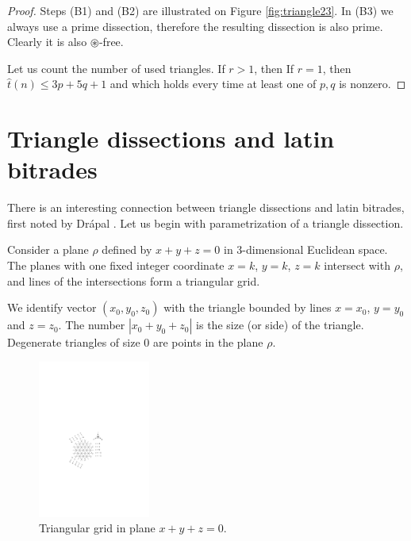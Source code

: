 \begin{proof}
Steps (B1) and (B2) are illustrated on Figure \ref{fig:triangle23}. In (B3) we always use a prime dissection, therefore the resulting dissection is also prime. Clearly it is also $\circledast$-free.

Let us count the number of used triangles. If $r > 1$, then
If $r=1$, then $\hat t(n) \leq 3p + 5q + 1$ and
which holds every time at least one of $p,q$ is nonzero.
\end{proof}

\section{Triangle dissections and latin bitrades}
\label{sec:dissections-and-bitrades}

There is an interesting connection between triangle dissections and latin bitrades, first noted by Drápal \cite{Drapal91}. Let us begin with parametrization of a triangle dissection.

Consider a plane $\rho$ defined by $x+y+z=0$ in 3-dimensional Euclidean space. The planes with one fixed integer coordinate $x=k$, $y=k$, $z=k$ intersect with $\rho$, and lines of the intersections form a triangular grid.

We identify vector $(x_0, y_0, z_0)$ with the triangle bounded by lines $x=x_0$, $y=y_0$ and $z=z_0$. The number $|x_0+y_0+z_0|$ is the size (or side) of the triangle. Degenerate triangles of size 0 are points in the plane $\rho$.

\begin{figure}[htb]
\centering
\includegraphics[height=14em]{img/trigrid.pdf}
\caption{Triangular grid in plane $x+y+z=0$.}
\label{fig:trigrid}
\end{figure}

